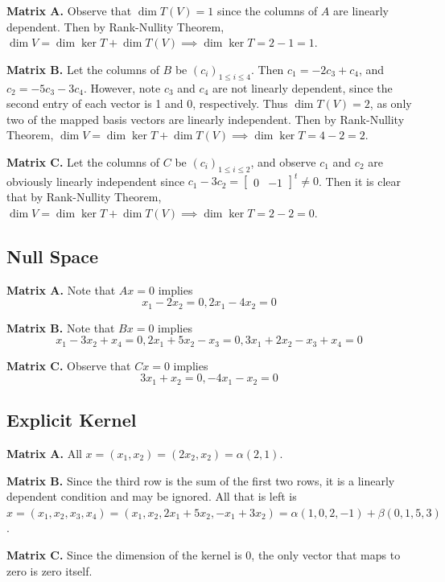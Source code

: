 \documentclass{article}
\theoremstyle{named}
\begin{document}
\textbf{Matrix A.} Observe that $\dim T(V) = 1$ since the columns of $A$ are linearly dependent. Then by Rank-Nullity Theorem, $\dim V = \dim \ker T + \dim T(V) \implies \dim \ker T = 2 - 1 = 1$. 
\bigskip

\textbf{Matrix B.} Let the columns of $B$ be $(c_i)_{1 \leq i \leq 4}$. Then $c_1 = -2c_3 + c_4$, and $c_2 = -5c_3 - 3c_4$. However, note $c_3$ and $c_4$ are not linearly dependent, since the second entry of each vector is 1 and 0, respectively. Thus $\dim T(V) = 2$, as only two of the mapped basis vectors are linearly independent. Then by Rank-Nullity Theorem, $\dim V = \dim \ker T + \dim T(V) \implies \dim \ker T = 4 - 2 = 2$. 
\bigskip

\textbf{Matrix C.} Let the columns of $C$ be $(c_i)_{1 \leq i \leq 2}$, and observe $c_1$ and $c_2$ are obviously linearly independent since $c_1 - 3c_2 = \begin{bmatrix} 0 & -1 \end{bmatrix}^t \neq 0 $. Then it is clear that by Rank-Nullity Theorem, $\dim V = \dim \ker T + \dim T(V) \implies \dim \ker T = 2 - 2 = 0$. 

\subsection{Null Space}

\textbf{Matrix A.} Note that $Ax = 0$ implies
\[
    x_1 - 2x_2 = 0, 2x_1 - 4x_2 = 0
\]

\textbf{Matrix B.} Note that $Bx = 0$ implies
\[
    x_1 - 3x_2 + x_4 = 0, 2x_1 + 5x_2 - x_3 = 0, 3x_1 + 2x_2 - x_3 + x_4 = 0
\]

\textbf{Matrix C.} Observe that $Cx = 0$ implies
\[
    3x_1 + x_2 = 0, -4x_1 - x_2 = 0
\]

\subsection{Explicit Kernel}

\textbf{Matrix A.} All $x = (x_1, x_2) = (2x_2, x_2) = \alpha (2, 1)$. 
\bigskip

\textbf{Matrix B.} Since the third row is the sum of the first two rows, it is a linearly dependent condition and may be ignored. All that is left is $x = (x_1, x_2, x_3, x_4) = (x_1, x_2, 2x_1 + 5x_2, -x_1 + 3x_2) = \alpha (1, 0, 2, -1) + \beta (0, 1, 5, 3)$. 
\bigskip

\textbf{Matrix C.} Since the dimension of the kernel is 0, the only vector that maps to zero is zero itself. 
\end{document}
